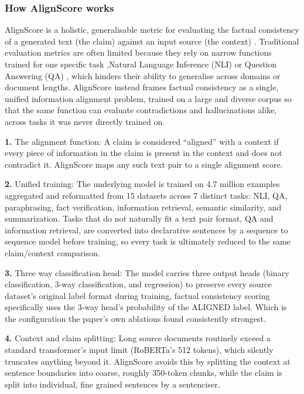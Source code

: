 \documentclass[11pt,a4paper]{article}
\begin{document}
 \subsubsection{How AlignScore works}

 AlignScore is a holistic, generalisable metric for evaluating the factual consistency of a generated text (the claim) against an input source (the context) \cite{zha2023alignscore} . Traditional evaluation metrics are often limited because they rely on narrow functions trained for one specific task ,Natural Language Inference (NLI) or Question Answering (QA) , which hinders their ability to generalise across domains or document lengths. AlignScore instead frames factual consistency as a single, unified information alignment problem, trained on a large and diverse corpus so that the same function can evaluate contradictions and hallucinations alike, across tasks it was never directly trained on.
 
 \textbf{1.} The alignment function: A claim is considered “aligned” with a context if every piece of information in the claim is present in the context and does not contradict it. AlignScore maps any such text pair to a single alignment score. \cite{zha2023alignscore}
 
 \textbf{2.} Unified training: The underlying model is trained on 4.7 million examples aggregated and reformatted from 15 datasets across 7 distinct tasks: NLI, QA, paraphrasing, fact verification, information retrieval, semantic similarity, and summarization. Tasks that do not naturally fit a text pair format, QA and information retrieval,  are converted into declarative sentences by a sequence to sequence model before training, so every task is ultimately reduced to the same claim/context comparison. \cite{zha2023alignscore}
 
 \textbf{3.} Three way classification head: The model carries three output heads (binary classification, 3-way classification, and regression) to preserve every source dataset's original label format during training, factual consistency scoring specifically uses the 3-way head's probability of the ALIGNED label. Which is the configuration the paper's own ablations found consistently strongest. \cite{zha2023alignscore}
 
 \textbf{4.} Context and claim splitting: Long source documents routinely exceed a standard transformer's input limit (RoBERTa's 512 tokens), which silently truncates anything beyond it. AlignScore avoids this by splitting the context at sentence boundaries into coarse, roughly 350-token chunks, while the claim is split into individual, fine grained sentences by a sentenciser. \cite{zha2023alignscore}
 
\end{document}
